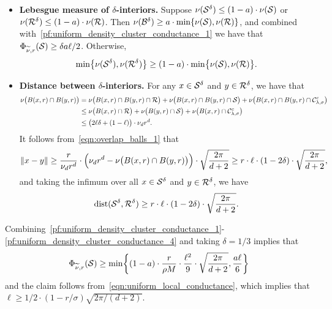 \begin{itemize}
\begin{equation}
		\end{equation}
		\item \textbf{Lebesgue measure of $\delta$-interiors.} Suppose $\nu(\mathcal{S}^{\delta}) \leq (1 - a) \cdot \nu(\mathcal{S})$ or $\nu(\mathcal{R}^{\delta}) \leq (1 - a) \cdot \nu(\mathcal{R})$. Then 
		$\nu(\mathcal{B}^{\delta}) \geq a \cdot \min\{\nu(\mathcal{S}), \nu(\mathcal{R})\}$, and combined with~\eqref{pf:uniform_density_cluster_conductance_1} we have that $\Phi_{\widetilde{\nu},r}(\mathcal{S}) \geq \delta a \ell/2$. Otherwise,
		\begin{equation}
		\label{pf:uniform_density_cluster_conductance_3}
		\min\bigl\{\nu(\mathcal{S}^{\delta}),\nu(\mathcal{R}^{\delta})\bigr\} \geq (1- a) \cdot \min\bigl\{\nu(\mathcal{S}),\nu(\mathcal{R})\bigr\}.
		\end{equation}
		\item \textbf{Distance between $\delta$-interiors.} For any $x \in \mathcal{S}^{\delta}$ and $y \in \mathcal{R}^{\delta}$, we have that 
		\begin{align*}
		\nu\bigl(B(x,r) \cap B(y,r)\bigr) & = \nu\bigl(B(x,r) \cap B(y,r) \cap \mathcal{R}\bigr) + \nu\bigl(B(x,r) \cap B(y,r) \cap \mathcal{S}\bigr) + \nu\bigl(B(x,r) \cap B(y,r) \cap \mathcal{C}_{\lambda,\sigma}^c\bigr) \\
		& \leq \nu\bigl(B(x,r) \cap \mathcal{R}\bigr) + \nu\bigl(B(y,r) \cap \mathcal{S}\bigr) + \nu\bigl(B(x,r) \cap \mathcal{C}_{\lambda,\sigma}^c\bigr) \\
		& \leq \bigl(2\ell\delta + (1 - \ell)\bigr) \cdot \nu_dr^d.
		\end{align*}
		It follows from~\eqref{eqn:overlap_balls_1} that
		\begin{equation*}
		\|x - y\| \geq \frac{r}{\nu_d r^d} \cdot \Bigl(\nu_d r^d - \nu\bigl(B(x,r) \cap B(y,r)\bigr)\Bigr) \cdot \sqrt{\frac{2\pi}{d + 2}} \geq r \cdot \ell \cdot (1 - 2\delta) \cdot \sqrt{\frac{2\pi}{d + 2}},
		\end{equation*}
		and taking the infimum over all $x \in \mathcal{S}^{\delta}$ and $y \in \mathcal{R}^{\delta}$, we have
		\begin{equation}
		\label{pf:uniform_density_cluster_conductance_4}
		\mathrm{dist}(\mathcal{S}^{\delta},\mathcal{R}^{\delta}) \geq r \cdot \ell \cdot (1 - 2\delta) \cdot \sqrt{\frac{2\pi}{d + 2}}.
		\end{equation}
	\end{itemize}	
	Combining~\eqref{pf:uniform_density_cluster_conductance_1}-\eqref{pf:uniform_density_cluster_conductance_4} and taking $\delta = 1/3$ implies that
	\begin{equation*}
	\Phi_{\widetilde{\nu},r}(\mathcal{S}) \geq \min\biggl\{(1 - a) \cdot \frac{r}{\rho M} \cdot \frac{\ell^2}{9} \cdot \sqrt{\frac{2\pi}{d + 2}}, \frac{a\ell}{6}\biggr\}
	\end{equation*}
	and the claim follows from~\eqref{eqn:uniform_local_conductance}, which implies that $\ell \geq 1/2 \cdot (1 - r/\sigma)\sqrt{2\pi/(d + 2)}$.

